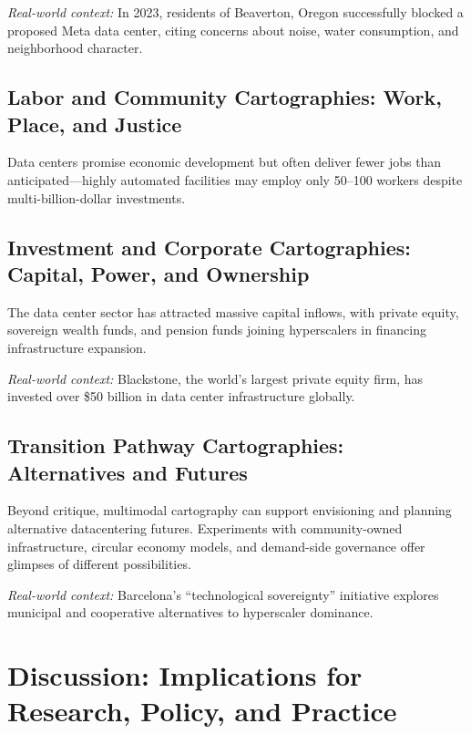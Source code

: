 \documentclass[../../main.tex]{subfiles}
\begin{document}
\textit{Real-world context:} In 2023, residents of Beaverton, Oregon successfully blocked a proposed Meta data center, citing concerns about noise, water consumption, and neighborhood character.

\subsection{Labor and Community Cartographies: Work, Place, and Justice}

Data centers promise economic development but often deliver fewer jobs than anticipated---highly automated facilities may employ only 50--100 workers despite multi-billion-dollar investments.

\subsection{Investment and Corporate Cartographies: Capital, Power, and Ownership}

The data center sector has attracted massive capital inflows, with private equity, sovereign wealth funds, and pension funds joining hyperscalers in financing infrastructure expansion.

\textit{Real-world context:} Blackstone, the world's largest private equity firm, has invested over \$50 billion in data center infrastructure globally.

\subsection{Transition Pathway Cartographies: Alternatives and Futures}

Beyond critique, multimodal cartography can support envisioning and planning alternative datacentering futures. Experiments with community-owned infrastructure, circular economy models, and demand-side governance offer glimpses of different possibilities.

\textit{Real-world context:} Barcelona's ``technological sovereignty'' initiative explores municipal and cooperative alternatives to hyperscaler dominance.

\section{Discussion: Implications for Research, Policy, and Practice}
\end{document}
